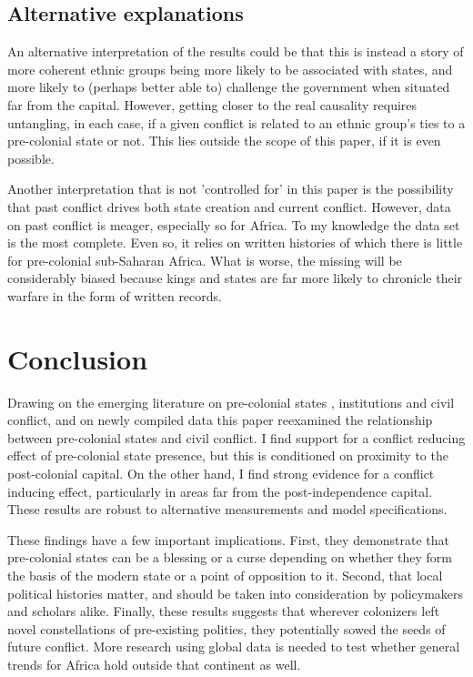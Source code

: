 \documentclass[12pt]{article}
\begin{document}

\subsection{Alternative explanations}

An alternative interpretation of the results could be that this is instead a
story of more coherent ethnic groups being more likely to be associated with
states, and more likely to (perhaps better able to) challenge the government
when situated far from the capital. However, getting closer to the real
causality requires untangling, in each case, if a given conflict is related to
an ethnic group's ties to a pre-colonial state or not. This lies outside the
scope of this paper, if it is even possible.

Another interpretation that is not 'controlled for' in this paper is the
possibility that past conflict drives both state creation and current conflict.
However, data on past conflict is meager, especially so for Africa. To my
knowledge the \citet{Brecke1999} data set is the most complete. Even so, it
relies on written histories of which there is little for pre-colonial
sub-Saharan Africa. What is worse, the missing will be considerably biased
because kings and states are far more likely to chronicle their warfare in the
form of written records.

\section{Conclusion}

Drawing on the emerging literature on pre-colonial states \citep{Paine2019,
Depetris-Chauvin2016}, institutions \citep{Wig2016, Englebert2002,
Michalopoulos2018} and civil conflict, and on newly compiled data this paper
reexamined the relationship between pre-colonial states and civil conflict. I
find support for a conflict reducing effect of pre-colonial state presence, but
this is conditioned on proximity to the post-colonial capital. On the other
hand, I find strong evidence for a conflict inducing effect, particularly in
areas far from the post-independence capital. These results are robust to
alternative measurements and model specifications.

These findings have a few important implications. First, they demonstrate that
pre-colonial states can be a blessing or a curse depending on whether they form
the basis of the modern state or a point of opposition to it. Second, that local
political histories matter, and should be taken into consideration by
policymakers and scholars alike. Finally, these results suggests that wherever
colonizers left novel constellations of pre-existing polities, they potentially
sowed the seeds of future conflict. More research using global data is needed to
test whether general trends for Africa hold outside that continent as well.
\end{document}
